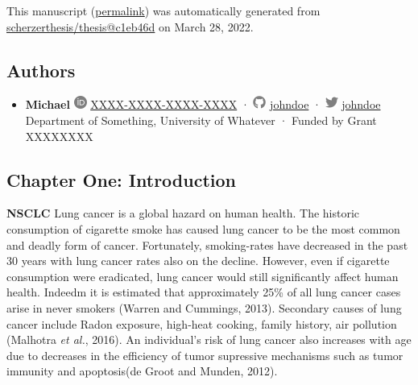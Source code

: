This manuscript
(\href{https://scherzerthesis.github.io/thesis/v/c1eb46dca3a6035d359424450c0f133449d977a6/}{permalink})
was automatically generated
from \href{https://github.com/scherzerthesis/thesis/tree/c1eb46dca3a6035d359424450c0f133449d977a6}{scherzerthesis/thesis@c1eb46d}
on March 28, 2022.

\hypertarget{authors}{%
\subsection{Authors}\label{authors}}

\begin{itemize}
\tightlist
\item
  \textbf{Michael}
  \includegraphics[width=0.16667in,height=0.16667in]{images/orcid.svg}
  \href{https://orcid.org/XXXX-XXXX-XXXX-XXXX}{XXXX-XXXX-XXXX-XXXX}
  · \includegraphics[width=0.16667in,height=0.16667in]{images/github.svg}
  \href{https://github.com/johndoe}{johndoe}
  · \includegraphics[width=0.16667in,height=0.16667in]{images/twitter.svg}
  \href{https://twitter.com/johndoe}{johndoe}
  Department of Something, University of Whatever
  · Funded by Grant XXXXXXXX
\end{itemize}

\hypertarget{chapter-one-introduction}{%
\subsection{Chapter One: Introduction}\label{chapter-one-introduction}}

\textbf{NSCLC} Lung cancer is a global hazard on human health. The historic consumption of cigarette smoke has caused lung cancer to be the most common and deadly form of cancer. Fortunately, smoking-rates have decreased in the past 30 years with lung cancer rates also on the decline. However, even if cigarette consumption were eradicated, lung cancer would still significantly affect human health. Indeedm it is estimated that approximately 25\% of all lung cancer cases arise in never smokers (Warren and Cummings, 2013). Secondary causes of lung cancer include Radon exposure, high-heat cooking, family history, air pollution (Malhotra \emph{et al.}, 2016). An individual's risk of lung cancer also increases with age due to decreases in the efficiency of tumor supressive mechanisms such as tumor immunity and apoptosis(de Groot and Munden, 2012).

